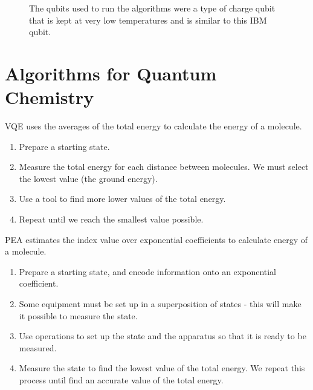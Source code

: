 \documentclass[14pt,landscape,color=UCLdarkred,margin=3cm]{uclposter}
\begin{document}
\begin{multicols}{3}
\begin{figure}[H]
\begin{center}
\begin{minipage}[c]{9em}
  \end{minipage}
  \qquad
  \begin{minipage}[c]{29em}
  \large

The qubits used to run the algorithms were a type of charge qubit that is kept at very low temperatures and is similar to this IBM qubit.

  \end{minipage}
  \end{center}

   
\end{figure}

\section*{Algorithms for Quantum Chemistry}

VQE uses the averages of the total energy to calculate the energy of a molecule.

\begin{highlightbox}
  \begin{enumerate}
\item Prepare a starting state. 
\item Measure the total energy for each distance between molecules. We must select the lowest value (the ground energy).
\item Use a tool to find more lower values of the total energy.
\item Repeat until we reach the smallest value possible.
\end{enumerate}
\end{highlightbox}

PEA estimates the index value over exponential coefficients to calculate energy of a molecule.


\begin{highlightbox}
\begin{enumerate}
\item Prepare a starting state, and encode information onto an exponential coefficient. 
\item Some equipment must be set up in a superposition of states - this will make it possible to measure the state.
\item Use operations to set up the state and the apparatus so that it is ready to be measured. 
\item Measure the state to find the lowest value of the total energy. We repeat this process until find an accurate value of the total energy.
\end{enumerate}
\end{highlightbox}



\end{multicols}
\end{document}
